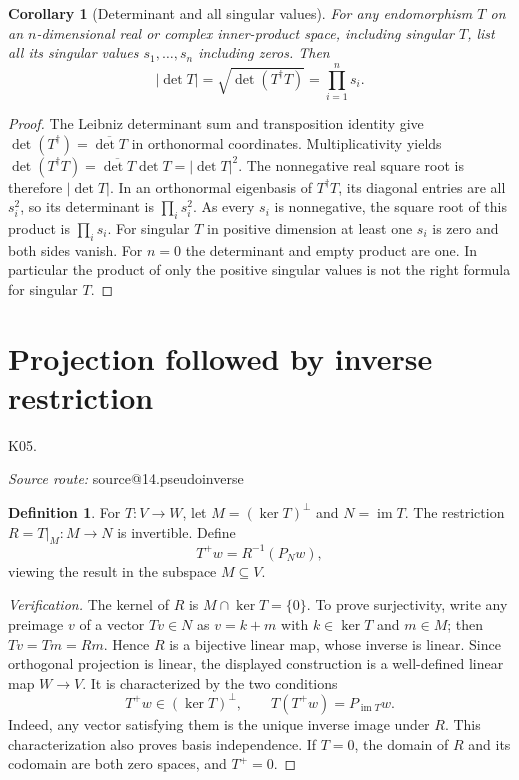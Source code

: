\documentclass[11pt,a4paper]{book}
\makeatletter
\newtheorem{corollary}[theorem]{Corollary}
\theoremstyle{definition}\newtheorem{definition}[theorem]{Definition}
\theoremstyle{remark}\newtheorem{remark}[theorem]{Remark}
\DeclareMathOperator{\im}{im}\DeclareMathOperator{\rank}{rank}
\newcommand{\Kentry}[2]{\section{#2}\label{k:#1}\noindent\textsf{\small K05.\detokenize{#1}}\par
  \begingroup\small\color{black!65}\textit{Source route: }\csname source@#1\endcsname\par\endgroup}
\makeatother
\begin{document}
\begin{corollary}[Determinant and all singular values]
For any endomorphism $T$ on an $n$-dimensional real or complex inner-product space, including singular $T$, list all its singular values $s_1,\ldots,s_n$ including zeros. Then
\[
|\det T|=\sqrt{\det(T^\dagger T)}=\prod_{i=1}^n s_i.
\]
\end{corollary}
\begin{proof}
The Leibniz determinant sum and transposition identity give
$\det(T^\dagger)=\overline{\det T}$ in orthonormal coordinates. Multiplicativity yields
$\det(T^\dagger T)=\overline{\det T}\det T=|\det T|^2$.
The nonnegative real square root is therefore $|\det T|$. In an orthonormal eigenbasis of $T^\dagger T$, its diagonal entries are all $s_i^2$, so its determinant is $\prod_i s_i^2$. As every $s_i$ is nonnegative, the square root of this product is $\prod_i s_i$. For singular $T$ in positive dimension at least one $s_i$ is zero and both sides vanish. For $n=0$ the determinant and empty product are one. In particular the product of only the positive singular values is not the right formula for singular $T$.
\end{proof}

\Kentry{14.pseudoinverse}{Projection followed by inverse restriction}
\begin{definition}
For $T:V\to W$, let $M=(\ker T)^\perp$ and $N=\im T$. The restriction $R=T|_M:M\to N$ is invertible. Define
\[
T^+w=R^{-1}(P_Nw),
\]
viewing the result in the subspace $M\subseteq V$.
\end{definition}
\begin{proof}[Verification]
The kernel of $R$ is $M\cap\ker T=\{0\}$. To prove surjectivity, write any preimage $v$ of a vector $Tv\in N$ as $v=k+m$ with $k\in\ker T$ and $m\in M$; then $Tv=Tm=Rm$. Hence $R$ is a bijective linear map, whose inverse is linear. Since orthogonal projection is linear, the displayed construction is a well-defined linear map $W\to V$. It is characterized by the two conditions
\[
T^+w\in(\ker T)^\perp,\qquad T(T^+w)=P_{\im T}w.
\]
Indeed, any vector satisfying them is the unique inverse image under $R$. This characterization also proves basis independence. If $T=0$, the domain of $R$ and its codomain are both zero spaces, and $T^+=0$.
\end{proof}
\end{document}
